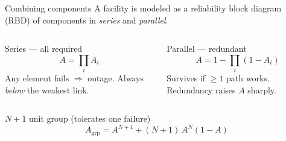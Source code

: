 \documentclass[aspectratio=169,10pt]{beamer}
\begin{document}
\begin{frame}{Combining components}
  A facility is modeled as a reliability block diagram (RBD) of components in
  \emph{series} and \emph{parallel}.

  \vspace{0.4em}
  \begin{columns}[T]
      \begin{block}{Series — all required}
        \[ A = \prod_i A_i \]
        Any element fails $\Rightarrow$ outage. Always \emph{below} the weakest link.
      \end{block}
      \begin{block}{Parallel — redundant}
        \[ A = 1 - \prod_i (1-A_i) \]
        Survives if $\geq 1$ path works. Redundancy raises $A$ sharply.
      \end{block}
  \end{columns}

  \vspace{0.5em}
  \begin{alertblock}{$N{+}1$ unit group (tolerates one failure)}
    \[ A_{\text{grp}} = A^{N+1} + (N{+}1)\,A^{N}(1-A) \]
  \end{alertblock}
\end{frame}
\end{document}
